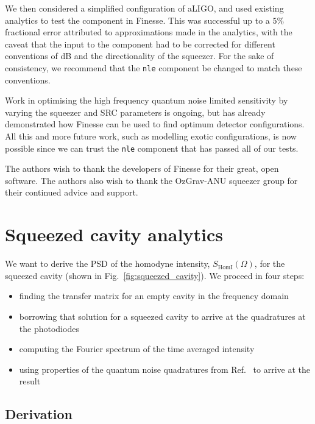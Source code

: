 \documentclass[aps,pra,superscriptaddress,reprint,nofootinbib]{revtex4-1}
\newcommand{\code}[1]{\texttt{#1}}
\begin{document}
We then considered a simplified configuration of aLIGO, and used existing analytics to test the component in Finesse. This was successful up to a $5\%$ fractional error attributed to approximations made in the analytics, with the caveat that the input to the component had to be corrected for different conventions of dB and the directionality of the squeezer.
For the sake of consistency, we recommend that the \code{nle} component be changed to match these conventions.


Work in optimising the high frequency quantum noise limited sensitivity by varying the squeezer and SRC parameters is ongoing, but has already demonstrated how Finesse can be used to find optimum detector configurations. All this and more future work, such as modelling exotic configurations, is now possible since we can trust the \code{nle} component that has passed all of our tests.


\begin{acknowledgments}
The authors wish to thank the developers of Finesse for their great, open software.
The authors also wish to thank the OzGrav-ANU squeezer group for their continued advice and support.

\end{acknowledgments}


\appendix
\section{Squeezed cavity analytics}
\label{app:squeezed_cavity_analytics}

We want to derive the PSD of the homodyne intensity, $S_{\mathrm{HomI}}(\Omega)$, for the squeezed cavity (shown in Fig.~\ref{fig:squeezed_cavity}). We proceed in four steps:
\begin{itemize}
\item finding the transfer matrix for an empty cavity in the frequency domain
\item borrowing that solution for a squeezed cavity to arrive at the quadratures at the photodiodes
\item computing the Fourier spectrum of the time averaged intensity
\item using properties of the quantum noise quadratures from Ref.~\cite{Danilishin_2012} to arrive at the result
\end{itemize}

\subsection{Derivation}
\end{document}
